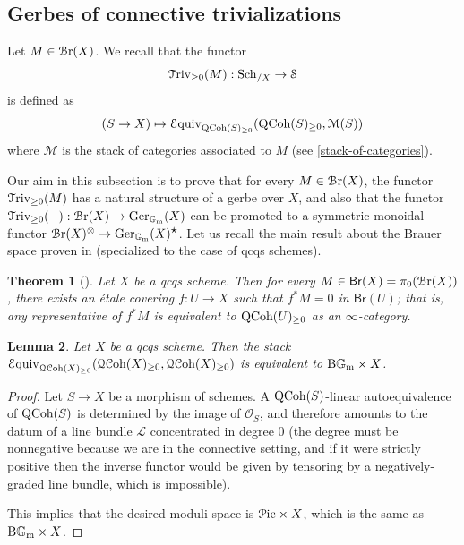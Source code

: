 \documentclass[11pt, twoside]{article} %
\numberwithin{equation}{section}
\theoremstyle{plain}
\newtheorem{thm}{Theorem}[section]
\newtheorem{lem}[thm]{Lemma}
\theoremstyle{definition}
\newcommand{\Equiv}{\mathcal{E}\textup{quiv}}
\newcommand{\cS}{\mathcal S}
\newcommand{\Gm}{\mathbb G_{\mathrm{m}}}
\newcommand{\QCoh}{\textup{QCoh}}
\newcommand{\BGm}{\textup{B}\Gm}
\newcommand{\Triv}{\mathcal{T}\textup{riv}}
\newcommand{\cO}{{\mathcal O}}
\newcommand{\cM}{\mathcal M}
\newcommand{\cL}{\mathcal L}
\newcommand{\cQCoh}{\mathcal{QC}\textup{oh}}
\newcommand{\Sch}{\textup{Sch}}
\newcommand{\Br}{\mathsf{Br}}
\newcommand{\cBr}{\mathcal{B}\textup{r}}
\newcommand{\Ger}{\textup{Ger}}
\newcommand{\cPic}{{\mathcal P\textup{ic}}}
\begin{document}
	
	
		\subsection{Gerbes of connective trivializations}\label{Triv-is-gerbe}
	
		Let $M\in \cBr(X)$. We recall that the functor $$\Triv_{\geq 0}(M):\Sch_{/X}\to \cS$$
		is defined as $$(S\to X)\mapsto \Equiv_{\QCoh(S)_{\geq 0}}(\QCoh(S)_{\geq 0},\cM(S))$$ where $\cM$ is the stack of categories associated to $M$ (see \cref{stack-of-categories}).
	
	Our aim in this subsection is to prove that for every $M\in \cBr(X)$, the functor $\Triv_{\geq 0}(M)$ has a natural structure of a gerbe over $X$, and also that the functor $\Triv_{\geq 0}(-):\cBr(X)\to \Ger_{\Gm}(X)$ can be promoted to a symmetric monoidal functor $\cBr(X)^\otimes\to \Ger_{\Gm}(X)^{\mathlarger\star}$.
	Let us recall the main result about the Brauer space proven in \cite{SAG} (specialized to the case of qcqs schemes).
	\begin{thm}[{\cite[Theorem 11.5.7.11]{SAG}}]\label{local-triviality-prestable}Let $X$ be a qcqs scheme. Then for every $M\in \Br(X)=\pi_0(\cBr(X))$, there exists an \'etale covering $f:U\to X$ such that $f^*M=0$ in $\Br(U)$; that is, any representative of $f^*M$ is equivalent to $\QCoh(U)_{\geq 0}$ as an $\infty$-category.
	\end{thm}
	
	
	\begin{lem}\label{local-lemma}
		Let $X$ be a qcqs scheme. Then the stack $\Equiv_{\cQCoh(X)_{\geq 0}}(\cQCoh(X)_{\geq 0},\cQCoh(X)_{\geq 0})$ is equivalent to $\BGm\times X$.
	\end{lem}
	\begin{proof}
		Let $S\to X$ be a morphism of schemes. A $\QCoh(S)$-linear autoequivalence of $\QCoh(S)$ is determined by the image of $\cO_S$, and therefore amounts to the datum of a line bundle $\cL$ concentrated in degree $0$ (the degree must be nonnegative because we are in the connective setting, and if it were strictly positive then the inverse functor would be given by tensoring by a negatively-graded line bundle, which is impossible).
		
		This implies that the desired moduli space is $\cPic\times X$, which is the same as $\BGm\times X$.
	\end{proof}
	
\end{document}
